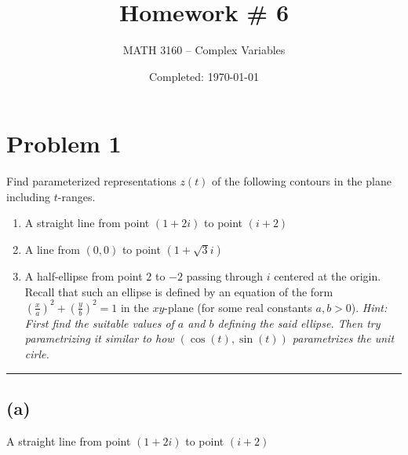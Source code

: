 \documentclass{article}
\title{Homework \# 6}
\author{
  MATH 3160 -- Complex Variables\\
  \myauthor
}
\date{Completed: \today}
\let\oldcos\cos
\let\oldsin\sin
\renewcommand{\cos}[1]{\oldcos\left(#1\right)}
\renewcommand{\sin}[1]{\oldsin\left(#1\right)}
\begin{document}
\maketitle %


\section*{Problem 1}
Find parameterized representations $z(t)$ of the following contours in the plane including $t$-ranges.
\begin{enumerate}
\item  A straight line from point $(1+2i)$ to point $(i+2)$
\item A line from $(0,0)$ to point $(1+\sqrt{3}i)$
\item A half-ellipse from point $2$ to $-2$ passing through $i$ centered at the origin. Recall that such an ellipse is defined by an equation of the form $ \left ( \frac{x}{a} \right )^2 + \left ( \frac{y}{b} \right )^2 = 1$ in the $xy$-plane (for some real constants $a,b >0$). {\it Hint: First find the suitable values of $a$ and $b$ defining the said ellipse. Then try parametrizing it similar to how $(\cos{t}, \sin{t})$ parametrizes the unit cirle.}
\end{enumerate}

\vspace{.5cm} 
\hrule 
\vspace{.5cm}
\subsection*{(a)}
A straight line from point $(1+2i)$ to point $(i+2)$
\end{document}
